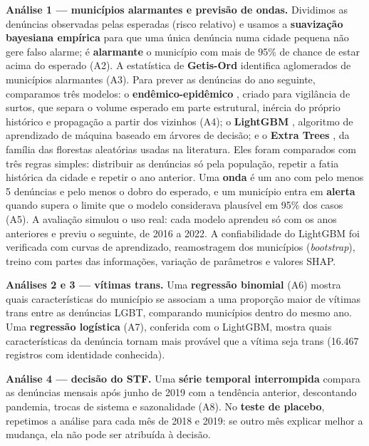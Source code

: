 \documentclass[12pt]{article}
\begin{document}
\textbf{Análise 1 --- municípios alarmantes e previsão de ondas.} Dividimos as denúncias observadas pelas esperadas (risco relativo) e usamos a \textbf{suavização bayesiana empírica} \cite{marshall:1991} para que uma única denúncia numa cidade pequena não gere falso alarme; é \textbf{alarmante} o município com mais de 95\% de chance de estar acima do esperado (A2). A estatística de \textbf{Getis-Ord} \cite{getis_ord:1992} identifica aglomerados de municípios alarmantes (A3). Para prever as denúncias do ano seguinte, comparamos três modelos: o \textbf{endêmico-epidêmico} \cite{held_hohle_hofmann:2005}, criado para vigilância de surtos, que separa o volume esperado em parte estrutural, inércia do próprio histórico e propagação a partir dos vizinhos (A4); o \textbf{LightGBM} \cite{ke:2017}, algoritmo de aprendizado de máquina baseado em árvores de decisão; e o \textbf{Extra Trees} \cite{geurts:2006}, da família das florestas aleatórias usadas na literatura. Eles foram comparados com três regras simples: distribuir as denúncias só pela população, repetir a fatia histórica da cidade e repetir o ano anterior. Uma \textbf{onda} é um ano com pelo menos 5 denúncias e pelo menos o dobro do esperado, e um município entra em \textbf{alerta} quando supera o limite que o modelo considerava plausível em 95\% dos casos \cite{farrington:1996} (A5). A avaliação simulou o uso real: cada modelo aprendeu só com os anos anteriores e previu o seguinte, de 2016 a 2022. A confiabilidade do LightGBM foi verificada com curvas de aprendizado, reamostragem dos municípios (\textit{bootstrap}), treino com partes das informações, variação de parâmetros e valores SHAP.

\textbf{Análises 2 e 3 --- vítimas trans.} Uma \textbf{regressão binomial} (A6) mostra quais características do município se associam a uma proporção maior de vítimas trans entre as denúncias LGBT, comparando municípios dentro do mesmo ano. Uma \textbf{regressão logística} (A7), conferida com o LightGBM, mostra quais características da denúncia tornam mais provável que a vítima seja trans (16.467 registros com identidade conhecida).

\textbf{Análise 4 --- decisão do STF.} Uma \textbf{série temporal interrompida} \cite{bernal:2017} compara as denúncias mensais após junho de 2019 com a tendência anterior, descontando pandemia, trocas de sistema e sazonalidade (A8). No \textbf{teste de placebo}, repetimos a análise para cada mês de 2018 e 2019: se outro mês explicar melhor a mudança, ela não pode ser atribuída à decisão.
\end{document}
